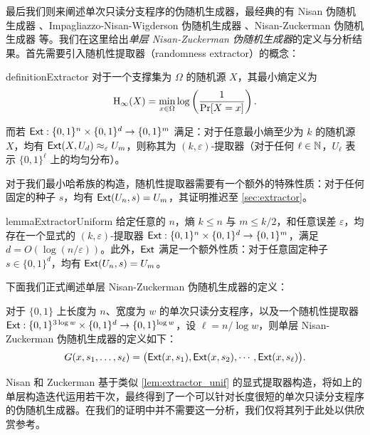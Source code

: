 最后我们则来阐述单次只读分支程序的伪随机生成器，最经典的有 Nisan 伪随机生成器 \cite{Nisan90_PRG}、Impagliazzo-Nisan-Wigderson 伪随机生成器 \cite{INW94_PRG}、Nisan-Zuckerman 伪随机生成器 \cite{NZ96_Nisan_Zuckerman_PRG} 等。我们在这里给出\emph{单层 Nisan-Zuckerman 伪随机生成器}的定义与分析结果。首先需要引入随机性提取器（randomness extractor）的概念：

\begin{restatable}{definition}{Extractor}\label{def:extractor}
    对于一个支撑集为 $\Omega$ 的随机源 $X$，其最小熵定义为
    $$
    \mathrm{H}_\infty(X) = \min_{x \in \Omega} \log \left( \frac{1}{\Pr[X = x]} \right).
    $$

    而若 $\mathsf{Ext} : \{0, 1\}^n \times \{0, 1\}^d \to \{0, 1\}^m$ 满足：对于任意最小熵至少为 $k$ 的随机源 $X$，均有 $\mathsf{Ext}(X, U_d) \approx_{\varepsilon} U_m$，则称其为 $(k,\varepsilon)$-提取器（对于任何 $\ell \in \mathbb{N}$，$U_\ell$ 表示 $\{0, 1\}^\ell$ 上的均匀分布）。
\end{restatable}

对于我们最小哈希族的构造，随机性提取器需要有一个额外的特殊性质：对于任何固定的种子 $s$，均有 $\mathsf{Ext}(U_n, s) = U_m$，其证明推迟至 \ref{sec:extractor}。

\begin{restatable}{lemma}{ExtractorUniform}\label{lem:extractor_unif}
    给定任意的 $n$，熵 $k \le n$ 与 $m \le k / 2$，和任意误差 $\varepsilon$，均存在一个显式的 $(k, \varepsilon)$-提取器 $\mathsf{Ext} : \{0, 1\}^n \times \{0, 1\}^d \to \{0, 1\}^m$，满足 $d = O(\log (n / \varepsilon))$。此外，$\mathsf{Ext}$ 满足一个额外性质：对于任意固定种子 $s \in \{0, 1\}^d$，均有 $\mathsf{Ext}(U_n, s) = U_m$。 
\end{restatable}

下面我们正式阐述单层 Nisan-Zuckerman 伪随机生成器的定义：

\begin{definition}\label{def:NZ_PRG}
    对于 $\{0, 1\}$ 上长度为 $n$、宽度为 $w$ 的单次只读分支程序，以及一个随机性提取器 $\mathsf{Ext} : \{0, 1\}^{3 \log w} \times \{0, 1\}^d \to \{0, 1\}^{\log w}$，设 $\ell = n / \log w$，则单层 Nisan-Zuckerman 伪随机生成器的定义如下：
    $$
    G(x, s_1, \ldots, s_\ell) = \big(\mathsf{Ext}(x, s_1), \mathsf{Ext}(x, s_2), \cdots, \mathsf{Ext}(x, s_\ell)\big).
    $$
\end{definition}

Nisan 和 Zuckerman 基于类似 \cref{lem:extractor_unif} 的显式提取器构造，将如上的单层构造迭代运用若干次，最终得到了一个可以针对长度很短的单次只读分支程序的伪随机生成器。在我们的证明中并不需要这一分析，我们仅将其列于此处以供欣赏参考。

